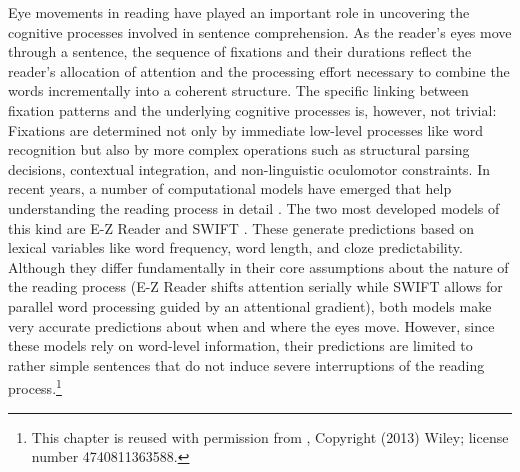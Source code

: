 \documentclass{cambridge7A}\usepackage[]{graphicx}\usepackage[]{color}
\begin{document}
Eye movements in reading have played an important role in uncovering the cognitive processes involved in sentence comprehension.  As the reader's eyes move through a sentence, the  sequence of fixations and their durations reflect the reader's allocation of attention and the processing effort necessary to combine the words incrementally into a coherent structure.  The specific linking between fixation patterns and the underlying cognitive processes is, however, not trivial: Fixations are determined not only by immediate low-level processes like word recognition but also by more complex operations such as structural parsing decisions, contextual integration, and non-linguistic oculomotor constraints.  In recent years, a number of computational models have emerged that help understanding the reading process in detail \citep{BicknellLevy2010a,EngbertEtAl2002,Engbert2005,Legge2002,Reichle1998,Nilsson2010,Reichle2006,Reilly2006}.  
The two most developed models of this kind are  E-Z Reader \citep{Reichle2006} and  SWIFT \citep{Engbert2005}.  These generate predictions based on  lexical variables like word frequency, word length, and cloze predictability.  Although they differ fundamentally in their core assumptions about the nature of the reading process (E-Z Reader shifts attention  serially while SWIFT allows for  parallel word processing guided by an attentional gradient), both models make very accurate predictions about when and where the eyes move.  However, since these models rely on word-level information, their predictions are limited to rather simple sentences that do not induce severe interruptions of the reading process.\footnote{This chapter is reused  with permission from \cite{Engelmanna}, Copyright (2013) Wiley; license number 4740811363588.}
\end{document}

